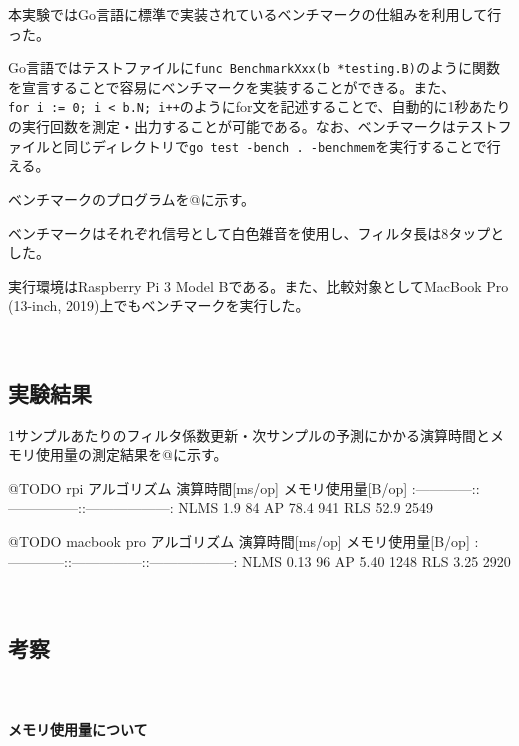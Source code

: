 本実験ではGo言語に標準で実装されているベンチマークの仕組みを利用して行った。

Go言語ではテストファイルに\texttt{func\ BenchmarkXxx(b\ *testing.B)}のように関数を宣言することで容易にベンチマークを実装することができる。また、\texttt{for\ i\ :=\ 0;\ i\ \textless{}\ b.N;\ i++}のようにfor文を記述することで、自動的に1秒あたりの実行回数を測定・出力することが可能である。なお、ベンチマークはテストファイルと同じディレクトリで\texttt{go\ test\ -bench\ .\ -benchmem}を実行することで行える。

ベンチマークのプログラムを@に示す。

ベンチマークはそれぞれ信号として白色雑音を使用し、フィルタ長は8タップとした。

実行環境はRaspberry Pi 3 Model Bである。また、比較対象としてMacBook Pro
(13-inch, 2019)上でもベンチマークを実行した。

\
\subsection{実験結果}\label{ux5b9fux9a13ux7d50ux679c-2}

1サンプルあたりのフィルタ係数更新・次サンプルの予測にかかる演算時間とメモリ使用量の測定結果を@に示す。

@TODO rpi \textbar{} アルゴリズム \textbar{} 演算時間{[}ms/op{]}
\textbar{} メモリ使用量{[}B/op{]} \textbar{}
\textbar:------------:\textbar:---------------:\textbar:------------------:\textbar{}
\textbar{} NLMS \textbar{} 1.9 \textbar{} 84 \textbar{} \textbar{} AP
\textbar{} 78.4 \textbar{} 941 \textbar{} \textbar{} RLS \textbar{} 52.9
\textbar{} 2549 \textbar{}

@TODO macbook pro \textbar{} アルゴリズム \textbar{} 演算時間{[}ms/op{]}
\textbar{} メモリ使用量{[}B/op{]} \textbar{}
\textbar:------------:\textbar:---------------:\textbar:------------------:\textbar{}
\textbar{} NLMS \textbar{} 0.13 \textbar{} 96 \textbar{} \textbar{} AP
\textbar{} 5.40 \textbar{} 1248 \textbar{} \textbar{} RLS \textbar{}
3.25 \textbar{} 2920 \textbar{}

\
\subsection{考察}\label{ux8003ux5bdf-2}

\
\paragraph{メモリ使用量について}\label{ux30e1ux30e2ux30eaux4f7fux7528ux91cfux306bux3064ux3044ux3066}

